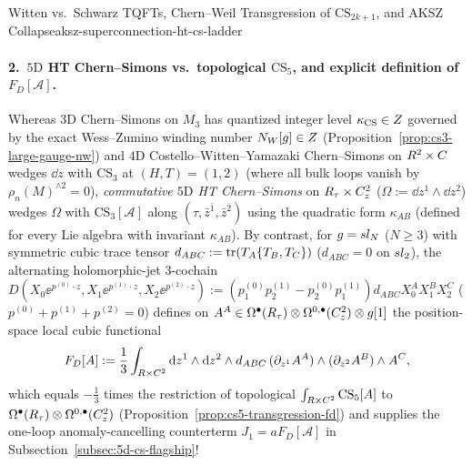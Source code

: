 \begin{zkmodule}{Witten vs.\ Schwarz TQFTs, Chern--Weil Transgression of $\mathrm{CS}_{2k+1}$, and AKSZ Collapse}{aksz-superconnection-ht-cs-ladder}
\paragraph{2.\ $5\mathrm{D}$ HT Chern--Simons vs.\ topological $\mathrm{CS}_5$, and explicit definition of $F_D[\mathcal{A}]$.}
Whereas $3\mathrm{D}$ Chern--Simons on $M_3$ has quantized integer level $\kappa_{\mathrm{CS}} \in Z$ governed by the exact Wess--Zumino winding number $N_W[g] \in Z$ (Proposition~\ref{prop:cs3-large-gauge-nw}) and $4\mathrm{D}$ Costello--Witten--Yamazaki Chern--Simons on $R^2\times C$~\cite{CWY18} wedges $\dd z$ with $\mathrm{CS}_3$ at $(H,T)=(1,2)$ (where all bulk loops vanish by $\rho_n(M)^{\wedge 2} = 0$), \emph{commutative $5\mathrm{D}$ HT Chern--Simons} on $R_\tau\times C^2_z$ ($\Omega := \dd z^1\wedge\dd z^2$) wedges $\Omega$ with $\mathrm{CS}_3[\mathcal{A}]$ along $(\tau,\bar{z}^{\bar{1}},\bar{z}^{\bar{2}})$ using the quadratic form $\kappa_{AB}$ (defined for every Lie algebra with invariant $\kappa_{AB}$). By contrast, for $g = sl_N$ ($N \ge 3$) with symmetric cubic trace tensor $d_{ABC} := \operatorname{tr}(T_A\{T_B,T_C\})$ ($d_{ABC} = 0$ on $sl_2$), the alternating holomorphic-jet $3$-cochain $D(X_0\ee^{p^{(0)}\cdot z}, X_1\ee^{p^{(1)}\cdot z}, X_2\ee^{p^{(2)}\cdot z}) := (p^{(0)}_1 p^{(1)}_2 - p^{(0)}_2 p^{(1)}_1)d_{ABC}X_0^A X_1^B X_2^C$ ($p^{(0)}+p^{(1)}+p^{(2)}=0$) defines on $A^A \in \Omega^\bullet(R_\tau)\otimes\Omega^{0,\bullet}(C^2_z)\otimes g[1]$ the position-space local cubic functional
\begin{equation}
\label{eq:FD-explicit-definition}
F_D[A] := \frac{1}{3}\int_{R\times C^2}\mathrm{d} z^1\wedge\mathrm{d} z^2\wedge d_{ABC}\,(\partial_{z^1}A^A)\wedge(\partial_{z^2}A^B)\wedge A^C,
\end{equation}
which equals $-\frac{1}{3}$ times the restriction of topological $\int_{R\times C^2}\mathrm{CS}_5[A]$ to $\Omega^\bullet(R_\tau)\otimes\Omega^{0,\bullet}(C^2_z)$ (Proposition~\ref{prop:cs5-transgression-fd}) and supplies the one-loop anomaly-cancelling counterterm $J_1 = a F_D[\mathcal{A}]$ in Subsection~\ref{subsec:5d-cs-flagship}!
\end{zkmodule}

